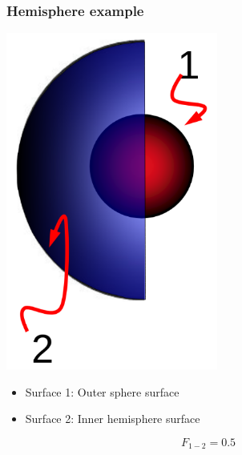 \documentclass[11pt]{article}
\begin{document}
\subsubsection{Hemisphere example}
\label{sec:orgc0ec94f}
\begin{center}
\includegraphics[height=30em]{./images/view-factor-hemisphere-example-diagram.png}
\end{center}
\begin{itemize}
\item Surface 1: Outer sphere surface
\item Surface 2: Inner hemisphere surface
\end{itemize}
\[F_{1-2} = 0.5\]
\end{document}
